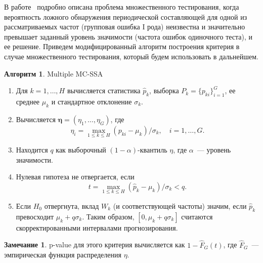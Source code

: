 \documentclass[specialist,
substylefile = spbu_report.rtx,
subf,href,colorlinks=true, 12pt]{disser}
\theoremstyle{definition}
\newtheorem{algorithm}{Алгоритм}
\newtheorem{remark}{Замечание}
\begin{document}
В работе~\cite{Golyandina_2023} подробно описана проблема множественного тестирования, когда вероятность ложного обнаружения периодической составляющей для одной из рассматриваемых частот (групповая ошибка I рода) неизвестна и значительно превышает заданный уровень значимости (частота ошибок одиночного теста), и ее решение. Приведем модифицированный алгоритм построения критерия в случае множественного тестирования, который будем использовать в дальнейшем.
\begin{algorithm}{Multiple MC-SSA~\cite{Golyandina_2023}}\label{alg:multiple_mc-ssa}
	\begin{enumerate}
		\item Для $k=1,\dots,H$ вычисляется статистика $\widehat{p}_k$, выборка $P_k=\{p_{ki}\}_{i=1}^G$, ее среднее $\mu_k$ и стандартное отклонение $\sigma_k$.
		\item Вычисляется $\mathbf{\eta}=(\eta_1,\dots,\eta_G)$, где
		      \[
			      \eta_i=\max_{1\leqslant k\leqslant H}(p_{ki}-\mu_k)/\sigma_k,\quad i=1,\dots,G.
		      \]
		\item Находится $q$ как выборочный $(1-\alpha)$-квантиль $\eta$, где $\alpha$~--- уровень значимости.
		\item Нулевая гипотеза не отвергается, если
		      \[
			      t = \max_{1\leqslant k\leqslant H}(\widehat{p}_k-\mu_k)/\sigma_k<q.
		      \]
		\item Если $H_0$ отвергнута, вклад $W_k$ (и соответствующей частоты) значим, если $\widehat{p}_k$ превосходит $\mu_k+q\sigma_k$. Таким образом, $[0,\mu_k+q\sigma_k]$ считаются скорректированными интервалами прогнозирования.
	\end{enumerate}
\end{algorithm}

\begin{remark}
	p-value для этого критерия вычисляется как $1-\hat F_G(t)$, где $\hat F_G$~--- эмпирическая функция распределения $\eta$.
\end{remark}



\end{document}
